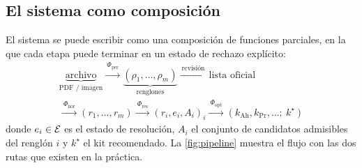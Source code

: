 \subsection{El sistema como composición}

El sistema se puede escribir como una composición de funciones parciales, en
la que cada etapa puede terminar en un estado de rechazo explícito:
\begin{multline*}
  \underbrace{\text{archivo}}_{\text{PDF / imagen}}
  \xrightarrow{\ \Phi_{\mathrm{per}}\ }
  \underbrace{(\rho_1,\dots,\rho_m)}_{\text{renglones}}
  \xrightarrow{\ \text{revisión}\ }
  \text{lista oficial}\\
  \xrightarrow{\ \Phi_{\mathrm{nor}}\ }
  (r_1,\dots,r_m)
  \xrightarrow{\ \Phi_{\mathrm{res}}\ }
  (r_i, e_i, A_i)_{i}
  \xrightarrow{\ \Phi_{\mathrm{opt}}\ }
  (k_{\text{Ah}}, k_{\text{Pr}}, \dots;\ k^\star)
\end{multline*}
donde $e_i\in\mathcal{E}$ es el estado de resolución, $A_i$ el conjunto de candidatos
admisibles del renglón $i$ y $k^\star$ el kit recomendado. La
\cref{fig:pipeline} muestra el flujo con las dos rutas que existen en la
práctica.

